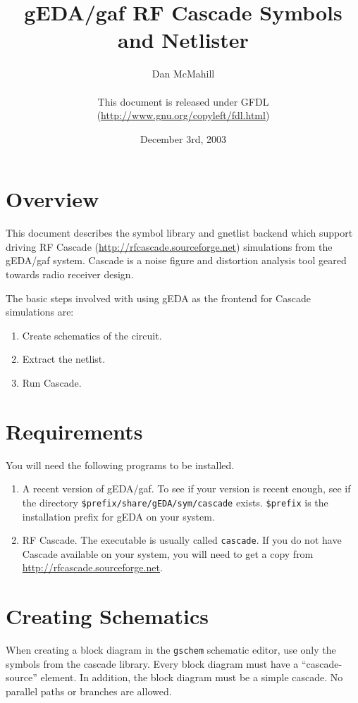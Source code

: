 \documentclass{article}
\title{gEDA/gaf RF Cascade  Symbols and Netlister}
\author{Dan McMahill\\
        \\
        This document is released under GFDL\\ 
        (\url{http://www.gnu.org/copyleft/fdl.html})}
\date{December 3rd, 2003}
\begin{document}
\maketitle
\newpage

\tableofcontents
\newpage


\section{Overview}
This document describes the symbol library and gnetlist backend which
support driving RF Cascade (\url{http://rfcascade.sourceforge.net})
simulations from the gEDA/gaf system.
Cascade is a noise figure and distortion analysis tool geared towards
radio receiver design.

The basic steps involved with using gEDA as the frontend for Cascade
simulations are:

\begin{enumerate}
\item Create schematics of the circuit.
\item Extract the netlist.
\item Run Cascade.
\end{enumerate}

\section{Requirements}
You will need the following programs to be installed.
\begin{enumerate}
\item A recent version of gEDA/gaf.  To see if your version is recent
  enough, see if the directory {\tt \${prefix}/share/gEDA/sym/cascade}
  exists.  {\tt \${prefix}} is the installation prefix for gEDA on
  your system.

\item RF Cascade.  The executable is usually called {\tt cascade}.  
  If you do
  not have Cascade available on your system, you will need to get a copy
  from \url{http://rfcascade.sourceforge.net}.
\end{enumerate}

\section{Creating Schematics}
When creating a block diagram in the {\tt gschem} schematic editor,
use only the symbols from the cascade library.  Every block diagram
must have a ``cascade-source'' element.  In addition, the block
diagram must be a simple cascade.  No parallel paths or branches are
allowed.
\end{document}
